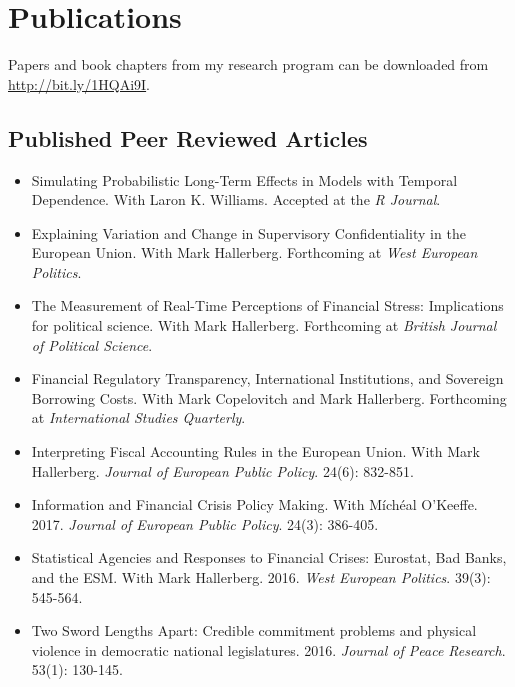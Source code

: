 \documentclass[a4paper]{article}
\begin{document}

\section*{Publications}

\noindent Papers and book chapters from my research program can be downloaded from {\url{http://bit.ly/1HQAi9I}}.

\subsection*{Published Peer Reviewed Articles}

\begin{itemize}

    \item Simulating Probabilistic Long-Term Effects in Models with Temporal Dependence. With Laron K. Williams. Accepted at the \emph{R Journal}.

    \item Explaining Variation and Change in Supervisory Confidentiality in the European Union. With Mark Hallerberg. Forthcoming at \emph{West European Politics}.

    \item The Measurement of Real-Time Perceptions of Financial Stress: Implications for political science. With Mark Hallerberg. Forthcoming at \emph{British Journal of Political Science}.

    \item Financial Regulatory Transparency, International Institutions, and Sovereign Borrowing Costs. With Mark Copelovitch and Mark Hallerberg. Forthcoming at \emph{International Studies Quarterly}.

    \item Interpreting Fiscal Accounting Rules in the European Union. With Mark Hallerberg. \emph{Journal of European Public Policy}. 24(6): 832-851.

    \item Information and Financial Crisis Policy Making. With M\'{i}ch\'{e}al O'Keeffe. 2017. \emph{Journal of European Public Policy}. 24(3): 386-405.

    \item Statistical Agencies and Responses to Financial Crises: Eurostat, Bad Banks, and the ESM. With Mark Hallerberg. 2016. {\emph{West European Politics}}. 39(3): 545-564.

    \item Two Sword Lengths Apart: Credible commitment problems and physical violence in democratic national legislatures. 2016. \emph{Journal of Peace Research}. 53(1): 130-145.


\end{itemize}
\end{document}
